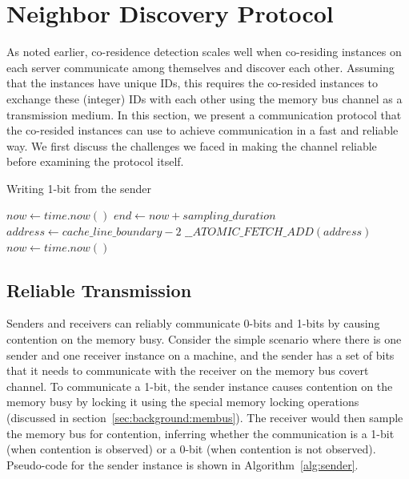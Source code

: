 \section{Neighbor Discovery Protocol}
\label{sec:technique}
 
As noted earlier, co-residence detection scales well when co-residing instances
on each server communicate among themselves and discover each other.  Assuming
that the instances have unique IDs, this requires the co-resided instances to
exchange these (integer) IDs with each other using the memory bus channel as a
transmission medium. In this section, we present a communication protocol that
the co-resided instances can use to achieve communication in a fast and reliable
way. We first discuss the challenges we faced in making the channel reliable
before examining the protocol itself.

\begin{algorithm}[!t]
\caption{Writing 1-bit from the sender}
\label{alg:sender}
\begin{algorithmic}
\STATE $now \leftarrow  time.now()$
\STATE $end \leftarrow now + sampling\_duration$
\STATE $address \leftarrow cache\_line\_boundary-2$
    \STATE $\_\_ATOMIC\_FETCH\_ADD(address)$
    \STATE $now \leftarrow  time.now()$
\ENDWHILE
\end{algorithmic}
\end{algorithm}

\subsection{Reliable Transmission}
Senders and receivers can reliably communicate 0-bits and 1-bits by causing
contention on the memory busy.  Consider the simple scenario where there is one
sender and one receiver instance on a machine, and the sender has a set of bits
that it needs to communicate with the receiver on the memory bus covert channel.
To communicate a 1-bit, the sender instance causes contention on the memory busy
by locking it using the special memory locking operations (discussed in
section~\ref{sec:background:membus}). The receiver would then sample the memory
bus for contention, inferring whether the communication is a 1-bit (when
contention is observed) or a 0-bit (when contention is not observed).
Pseudo-code for the sender instance is shown in Algorithm~\ref{alg:sender}.


